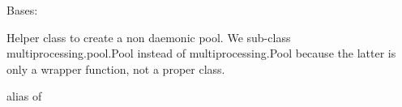 \documentclass[letterpaper,10pt,english,openany,oneside]{sphinxmanual}
\begin{document}

\begin{fulllineitems}
\label{\detokenize{pygpc:pygpc.misc.NonDaemonicPool}}
Bases: 

Helper class to create a non daemonic pool.
We sub-class multiprocessing.pool.Pool instead of multiprocessing.Pool
because the latter is only a wrapper function, not a proper class.

\begin{fulllineitems}
\label{\detokenize{pygpc:pygpc.misc.NonDaemonicPool.Process}}
alias of {\hyperref[\detokenize{pygpc:pygpc.misc.NoDaemonProcess}]{}}

\end{fulllineitems}


\end{fulllineitems}

\end{document}
